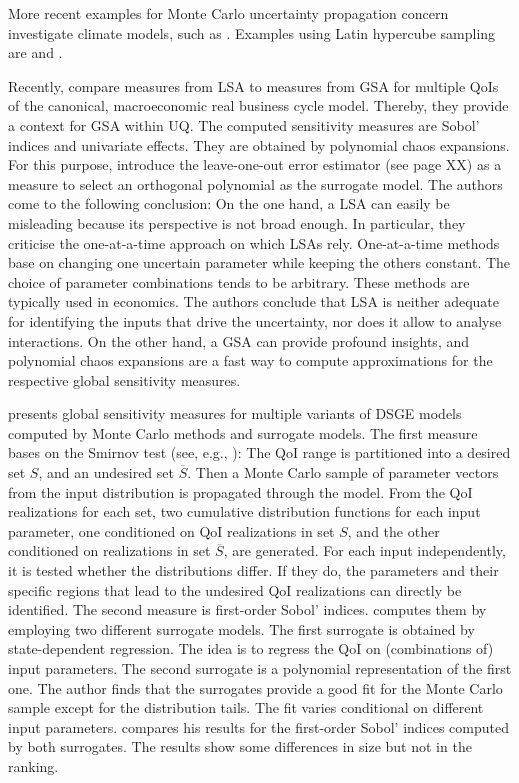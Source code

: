 More recent examples for Monte Carlo uncertainty propagation concern investigate climate models, such as \cite{Webster.2012}.
Examples using Latin hypercube sampling are \cite{Mattoo.2009} and \cite{Hope.2006}.

Recently, \cite{Harenberg.2019} compare measures from LSA to measures from GSA for multiple QoIs of the canonical, macroeconomic real business cycle model. Thereby, they provide a context for GSA within UQ. The computed sensitivity measures are Sobol' indices and univariate effects. They are obtained by polynomial chaos expansions. For this purpose, \citeauthor{Harenberg.2019} introduce the leave-one-out error estimator (see page XX) as a measure to select an orthogonal polynomial as the surrogate model. The authors come to the following conclusion: On the one hand, a LSA can easily be misleading because its perspective is not broad enough. In particular, they criticise the one-at-a-time approach on which LSAs rely. One-at-a-time methods base on changing one uncertain parameter while keeping the others constant. The choice of parameter combinations tends to be arbitrary. These methods are typically used in economics. The authors conclude that LSA is neither adequate for identifying the inputs that drive the uncertainty, nor does it allow to analyse interactions. On the other hand, a GSA can provide profound insights, and polynomial chaos expansions are a fast way to compute approximations for the respective global sensitivity measures.

\cite{Ratto.2008} presents global sensitivity measures for multiple variants of DSGE models computed by Monte Carlo methods and surrogate models. The first measure bases on the Smirnov test (see, e.g., \cite{Hornberger.1981}): The QoI range is partitioned into a desired set $S$, and an undesired set $\overline{S}$. Then a Monte Carlo sample of parameter vectors from the input distribution is propagated through the model. From the QoI realizations for each set, two cumulative distribution functions for each input parameter, one conditioned on QoI realizations in set $S$, and the other conditioned on realizations in set $\overline{S}$, are generated. For each input independently, it is tested whether the distributions differ. If they do, the parameters and their specific regions that lead to the undesired QoI realizations can directly be identified. The second measure is first-order Sobol' indices. \citeauthor{Ratto.2008} computes them by employing two different surrogate models. The first surrogate is obtained by state-dependent regression. The idea is to regress the QoI on (combinations of) input parameters. The second surrogate is a polynomial representation of the first one. The author finds that the surrogates provide a good fit for the Monte Carlo sample except for the distribution tails. The fit varies conditional on different input parameters. \citeauthor{Ratto.2008} compares his results for the first-order Sobol' indices computed by both surrogates. The results show some differences in size but not in the ranking.

